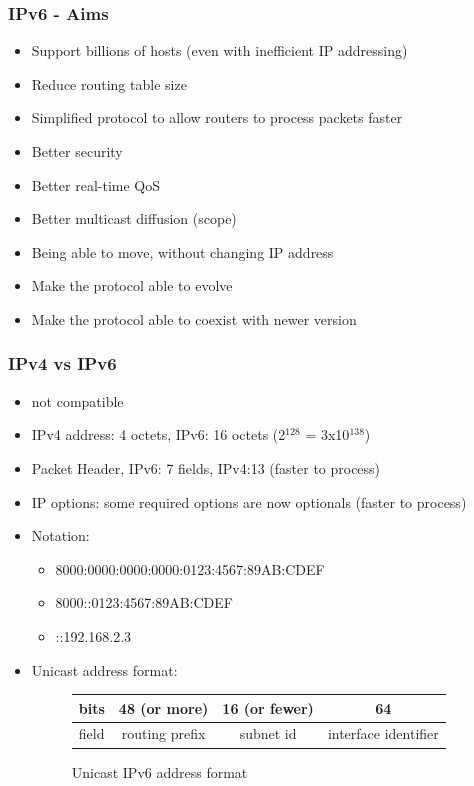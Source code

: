   \begin{frame}
    \frametitle{IPv6 - Aims}
    \begin{itemize}
      \item Support billions of hosts (even with inefficient IP addressing)
      \item Reduce routing table size
      \item Simplified protocol to allow routers to process packets faster
      \item Better security
      \item Better real-time QoS
      \item Better multicast diffusion (scope)
      \item Being able to move, without changing IP address
      \item Make the protocol able to evolve
      \item Make the protocol able to coexist with newer version
    \end{itemize}
  \end{frame}

  \begin{frame}
    \frametitle{IPv4 vs IPv6}
    \begin{itemize}
      \item not compatible
      \item IPv4 address: 4 octets, IPv6: 16 octets (2$^{128}$ = 3x10$^{138}$)
      \item Packet Header, IPv6: 7 fields, IPv4:13 (faster to process)
      \item IP options: some required options are now optionals (faster to process)
      \item Notation:
        \begin{itemize}
          \item 8000:0000:0000:0000:0123:4567:89AB:CDEF
          \item 8000::0123:4567:89AB:CDEF
          \item ::192.168.2.3
        \end{itemize}
      \item Unicast address format:
      \begin{figure}
        \centering
        \begin{tabular}{l|c|c|c}
          bits & 48 (or more) & 16 (or fewer) & 64 \\ \hline
          field & routing prefix & subnet id & interface identifier \\
        \end{tabular}
        \caption{Unicast IPv6 address format}
        \label{fig:uni-ipv6-address}
      \end{figure}
    \end{itemize}
  \end{frame}



